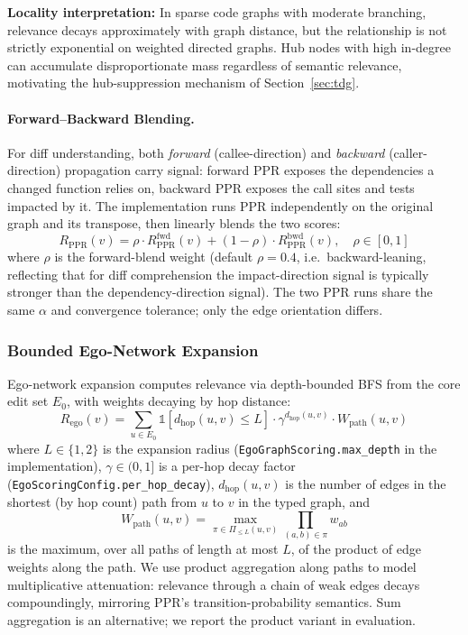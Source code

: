 \documentclass[11pt, a4paper]{article}
\providecommand{\mathbbm}[1]{\mathds{#1}}
\begin{document}
\textbf{Locality interpretation:} In sparse code graphs with moderate branching, relevance decays approximately with graph distance, but the relationship is not strictly exponential on weighted directed graphs. Hub nodes with high in-degree can accumulate disproportionate mass regardless of semantic relevance, motivating the hub-suppression mechanism of Section~\ref{sec:tdg}.

\paragraph{Forward--Backward Blending.} For diff understanding, both \emph{forward} (callee-direction) and \emph{backward} (caller-direction) propagation carry signal: forward PPR exposes the dependencies a changed function relies on, backward PPR exposes the call sites and tests impacted by it. The implementation runs PPR independently on the original graph and its transpose, then linearly blends the two scores:
\begin{equation}
R_{\mathrm{PPR}}(v) = \rho \cdot R_{\mathrm{PPR}}^{\mathrm{fwd}}(v) + (1 - \rho) \cdot R_{\mathrm{PPR}}^{\mathrm{bwd}}(v), \quad \rho \in [0, 1]
\label{eq:ppr-blend}
\end{equation}
where $\rho$ is the forward-blend weight (default $\rho = 0.4$, i.e.\ backward-leaning, reflecting that for diff comprehension the impact-direction signal is typically stronger than the dependency-direction signal). The two PPR runs share the same $\alpha$ and convergence tolerance; only the edge orientation differs.

\subsubsection{Bounded Ego-Network Expansion}
\label{sec:ego}

Ego-network expansion computes relevance via depth-bounded BFS from the core edit set $E_0$, with weights decaying by hop distance:
\begin{equation}
R_{\mathrm{ego}}(v) = \sum_{u \in E_0} \mathbbm{1}[d_{\mathrm{hop}}(u,v) \leq L] \cdot \gamma^{d_{\mathrm{hop}}(u,v)} \cdot W_{\mathrm{path}}(u, v)
\end{equation}
where $L \in \{1, 2\}$ is the expansion radius (\texttt{EgoGraphScoring.max\_depth} in the implementation), $\gamma \in (0, 1]$ is a per-hop decay factor (\texttt{EgoScoringConfig.per\_hop\_decay}), $d_{\mathrm{hop}}(u,v)$ is the number of edges in the shortest (by hop count) path from $u$ to $v$ in the typed graph, and
\begin{equation}
W_{\mathrm{path}}(u, v) = \max_{\pi \in \Pi_{\leq L}(u,v)} \prod_{(a,b) \in \pi} w_{ab}
\end{equation}
is the maximum, over all paths of length at most $L$, of the product of edge weights along the path. We use product aggregation along paths to model multiplicative attenuation: relevance through a chain of weak edges decays compoundingly, mirroring PPR's transition-probability semantics. Sum aggregation is an alternative; we report the product variant in evaluation.
\end{document}
